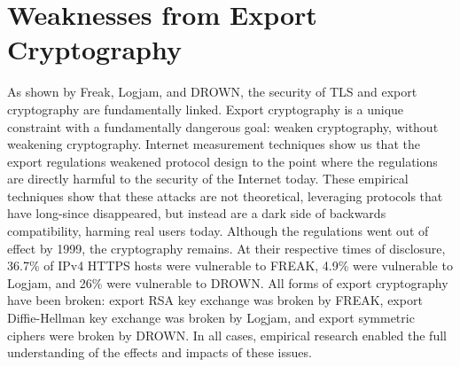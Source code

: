 \section{Weaknesses from Export Cryptography}

As shown by Freak, Logjam, and DROWN, the security of TLS and export
cryptography are fundamentally linked. Export cryptography is a unique
constraint with a fundamentally dangerous goal: weaken cryptography, without
weakening cryptography. Internet measurement techniques show us that the export
regulations weakened protocol design to the point where the regulations are
directly harmful to the security of the Internet today. These empirical
techniques show that these attacks are not theoretical, leveraging protocols
that have long-since disappeared, but instead are a dark side of backwards
compatibility, harming real users today. Although the regulations went out of
effect by 1999, the cryptography remains. At their respective times of
disclosure, 36.7\% of IPv4 HTTPS hosts were vulnerable to FREAK, 4.9\% were
vulnerable to Logjam, and 26\% were vulnerable to DROWN. All forms of export
cryptography have been broken: export RSA key exchange was broken by FREAK,
export Diffie-Hellman key exchange was broken by Logjam, and export symmetric
ciphers were broken by DROWN. In all cases, empirical research enabled the full
understanding of the effects and impacts of these issues.

